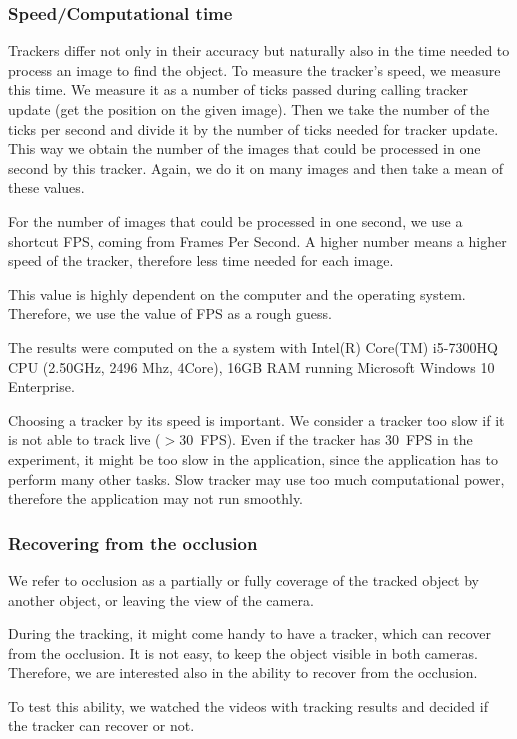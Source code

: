 \subsubsection*{Speed/Computational time}

Trackers differ not only in their accuracy but naturally also in the time
needed to process an image to find the object. To measure the tracker's speed,
we measure this time. We measure it as a number of ticks passed during calling
tracker update (get the position on the given image). Then we take the number
of the ticks per second and divide it by the number of ticks needed for tracker
update. This way we obtain the number of the images that could be processed in
one second by this tracker. Again, we do it on many images and then take a mean
of these values.

For the number of images that could be processed in one second, we use a
shortcut FPS, coming from Frames Per Second. A higher number means a higher
speed of the tracker, therefore less time needed for each image.

This value is highly dependent on the computer and the operating system.
Therefore, we use the value of FPS as a rough guess.

The results were computed on the a system with Intel(R) Core(TM) i5-7300HQ CPU
(2.50GHz, 2496 Mhz, 4Core), 16GB RAM running Microsoft Windows 10 Enterprise.

Choosing a tracker by its speed is important. We consider a tracker too slow if
it is not able to track live ($>$30~FPS). Even if the tracker has 30~FPS in the
experiment, it might be too slow in the application, since the application has
to perform many other tasks. Slow tracker may use too much computational power,
therefore the application may not run smoothly.

\subsubsection*{Recovering from the occlusion}

We refer to occlusion as a partially or fully coverage of the tracked object by
another object, or leaving the view of the camera.

During the tracking, it might come handy to have a tracker, which can recover
from the occlusion. It is not easy, to keep the object visible in both cameras.
Therefore, we are interested also in the ability to recover from the occlusion.

To test this ability, we watched the videos with tracking results and decided
if the tracker can recover or not.

